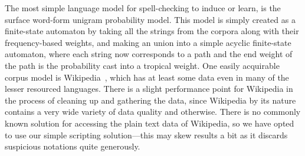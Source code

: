 \documentclass[a4paper,12pt]{article}
\begin{document}
The most simple language model for spell-checking to induce or learn, is
the surface word-form unigram probability model. This model is simply created
as a finite-state automaton by taking all the strings from the corpora along
with their frequency-based weights, and making an union into a simple acyclic
finite-state automaton, where each string now corresponds to a path and the end
weight of the path is the probability cast into a tropical weight. One easily
acquirable corpus model is Wikipedia~\cite[]{pirinen/2010/lrec}, which has at
least some data even in many of the lesser resourced languages. There is a
slight performance point for Wikipedia in the process of cleaning up and
gathering the data, since Wikipedia by its nature contains a very wide variety
of data quality and otherwise. There is no commonly known solution for
accessing the plain text data of Wikipedia, so we have opted to use our
simple scripting solution---this may skew results a bit as it discards
suspicious notations quite generously.
\end{document}
